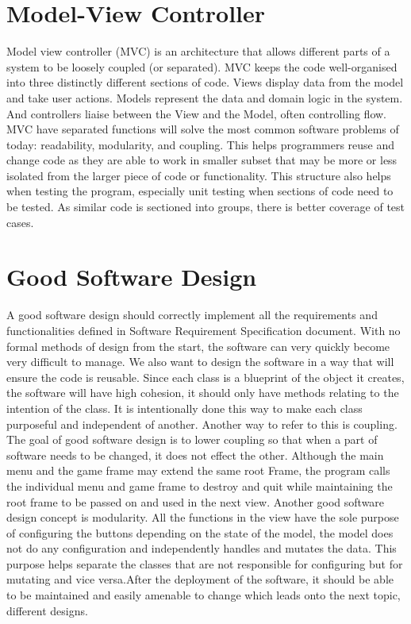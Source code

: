 \documentclass[12pt, a4]{report}
\begin{document}
	\section{Model-View Controller}
	\par Model view controller (MVC) is an architecture that allows different parts of a system to be loosely coupled (or separated). MVC keeps the code well-organised into three distinctly different sections of code. Views display data from the model and take user actions. Models represent the data and domain logic in the system. And controllers liaise between the View and the Model, often controlling flow. MVC have separated functions will solve the most common software problems of today: readability, modularity, and coupling. This helps programmers reuse and change code as they are able to work in smaller subset that may be more or less isolated from the larger piece of code or functionality. This structure also helps when testing the program, especially unit testing when sections of code need to be tested. As similar code is sectioned into groups, there is better coverage of test cases. 
	
	\section{Good Software Design}
	\par A good software design should correctly implement all the requirements and functionalities defined in Software Requirement Specification document. With no formal methods of design from the start, the software can very quickly become very difficult to manage. We also want to design the software in a way that will ensure the code is reusable. 
	Since each class is a blueprint of the object it creates, the software will have high cohesion, it should only have methods relating to the intention of the class. It is intentionally done this way to make each class purposeful and independent of another. Another way to refer to this is coupling. 
	The goal of good software design is to lower coupling so that when a part of software needs to be changed, it does not effect the other. 
	Although the main menu and the game frame may extend the same root Frame, the program calls the individual menu and game frame to destroy and quit while maintaining the root frame to be passed on and used in the next view. Another good software design concept is modularity. All the functions in the view have the sole purpose of configuring the buttons depending on the state of the model, the model does not do any configuration and independently handles and mutates the data. This purpose helps separate the classes that are not responsible for configuring but for mutating and vice versa.After the deployment of the software, it should be able to be maintained and easily amenable to change which leads onto the next topic, different designs. 
	\newpage
\end{document}

